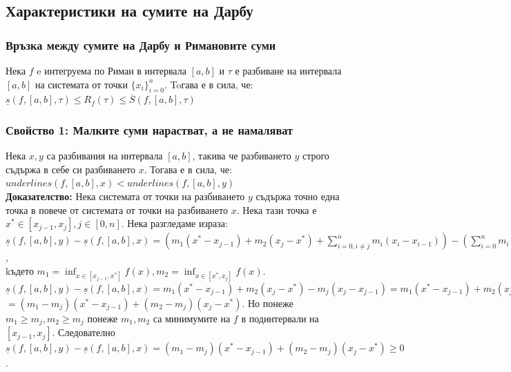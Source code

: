 \documentclass[fleqn,12pt]{article}
\begin{document}
\begin{flushleft}
\subsection{Характеристики на сумите на Дарбу}
\subsubsection{Връзка между сумите на Дарбу и Римановите суми}
Нека $f$ e интегруема по Риман в интервала $[a,b]$ и $\tau$ е разбиване на интервала $[a,b]$ на системата от точки $\{x_i\}_{i=0}^{n}$. Toгава е в сила, че:\\
$\underline{s}(f,[a,b],\tau) \leq R_f(\tau) \leq \overline{S}(f,[a,b],\tau)$

\subsubsection{Свойство 1: Малките суми нарастват, а не намаляват}
Нека $x,y$ са разбивания на интервала $[a,b]$, такива че разбиването $y$ строго съдържа в себе си разбиването $x$. Тогава е в сила, че:
$underline{s}(f,[a,b],x) < underline{s}(f,[a,b],y)$\\
\textbf{Доказателство: } Нека системата от точки на разбиването $y$ съдържа точно една точка в повече от системата от точки на разбиването $x$.
Нека тази точка е $x^{*} \in [x_{j-1},x_j], j\in [0,n]$. Нека разгледаме израза:
$\underline{s}(f,[a,b],y)-\underline{s}(f,[a,b],x) = (m_1(x^{*} - x_{j-1}) + m_2(x_j - x^{*}) + \sum_{i=0,i \neq j}^{n} m_i(x_i - x_{i-1})) - (\sum_{i=0}^{n} m_i(x_i - x_{i-1}))$,\\ kъдето
$m_1 =\inf_{x\in[x_{j-1},x^{*}]}f(x), m_2 =\inf_{x\in[x^{*},x_j]}f(x)$.\\
$\underline{s}(f,[a,b],y) - \underline{s}(f,[a,b],x) = m_1(x^{*} - x_{j-1}) + m_2(x_j - x^{*}) - m_j(x_j - x_{j-1}) = m_1(x^{*} - x_{j-1}) + m_2(x_j - x^{*}) - m_j(x_j + x^{*} - x^{*} - x_{j-1})$
$ = (m_1-m_j)(x^{*} - x_{j-1}) + (m_2-m_j)(x_j - x^{*})$. Но понеже $m_1 \geq m_j, m_2 \geq m_j$ понеже $m_1,m_2$ са минимумите на $f$ в подинтервали на $[x_{j-1},x_j]$.
Следователно $\underline{s}(f,[a,b],y) - \underline{s}(f,[a,b],x) = (m_1-m_j)(x^{*} - x_{j-1}) + (m_2-m_j)(x_j - x^{*}) \geq 0$.


\end{flushleft}
\end{document}
